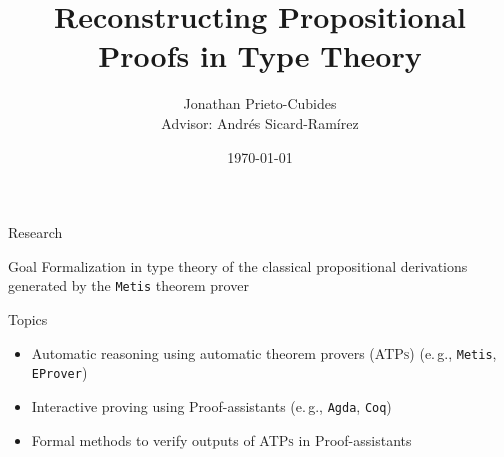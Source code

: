 \documentclass[10pt, xetex, hyperref={pdfpagelabels=false}]{beamer}
\title[Reconstructing Propositional Proofs in Type Theory]
  {\textbf{Reconstructing Propositional Proofs in Type Theory}}
\date{\today}
\author[Jonathan Prieto-Cubides]{Jonathan Prieto-Cubides\\
Advisor: Andr\'es Sicard-Ram\'irez
}
\institute{
Master in Applied Mathematics\\
Universidad EAFIT\\
Medell\'in, Colombia}
\newcommand{\abbre}[1]{\textsc{#1}\xspace}
\newcommand{\ATPs}{\abbre{ATPs}}
\newcommand{\name}[1]{\texttt{#1}\xspace}
\newcommand{\prg}[1]{\texttt{#1}\xspace}
\newcommand{\Agda}{\prg{Agda}}
\newcommand{\Metis}{\prg{Metis}}
\newcommand{\abbrev}[1]{#1} %
\newcommand{\eg}{\abbrev{e.\,g.}}
\begin{document}
\setcounter{page}{1}


\begin{frame}[plain]
\titlepage
\end{frame}


\begin{frame}{Research}

\begin{block}{Goal}
Formalization in type theory of the classical propositional
derivations generated by the \Metis theorem prover
\end{block}
\pause
\begin{block}{Topics}
\begin{itemize}
\item Automatic reasoning using automatic theorem provers (\ATPs) (\eg, \Metis, \name{EProver})
\item Interactive proving using Proof-assistants (\eg, \Agda, \name{Coq})
\item Formal methods to verify outputs of \ATPs in Proof-assistants
\end{itemize}
\end{block}
\end{frame}
\end{document}
